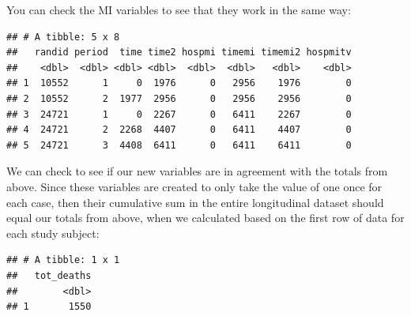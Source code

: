 \documentclass[
]{book}
\newenvironment{Shaded}{\begin{snugshade}}{\end{snugshade}}
\newcommand{\CommentTok}[1]{\textcolor[rgb]{0.56,0.35,0.01}{\textit{#1}}}
\newcommand{\DataTypeTok}[1]{\textcolor[rgb]{0.13,0.29,0.53}{#1}}
\newcommand{\DecValTok}[1]{\textcolor[rgb]{0.00,0.00,0.81}{#1}}
\newcommand{\KeywordTok}[1]{\textcolor[rgb]{0.13,0.29,0.53}{\textbf{#1}}}
\newcommand{\NormalTok}[1]{#1}
\newcommand{\OperatorTok}[1]{\textcolor[rgb]{0.81,0.36,0.00}{\textbf{#1}}}
\newcommand{\StringTok}[1]{\textcolor[rgb]{0.31,0.60,0.02}{#1}}
\begin{document}
You can check the MI variables to see that they work in the same way:

\begin{Shaded}
\end{Shaded}

\begin{verbatim}
## # A tibble: 5 x 8
##   randid period  time time2 hospmi timemi timemi2 hospmitv
##    <dbl>  <dbl> <dbl> <dbl>  <dbl>  <dbl>   <dbl>    <dbl>
## 1  10552      1     0  1976      0   2956    1976        0
## 2  10552      2  1977  2956      0   2956    2956        0
## 3  24721      1     0  2267      0   6411    2267        0
## 4  24721      2  2268  4407      0   6411    4407        0
## 5  24721      3  4408  6411      0   6411    6411        0
\end{verbatim}

We can check to see if our new variables are in agreement with the totals from above. Since these variables are created to only take the value of one once for each case, then their cumulative sum in the entire longitudinal dataset should equal our totals from above, when we calculated based on the first row of data for each study subject:

\begin{Shaded}
\end{Shaded}

\begin{verbatim}
## # A tibble: 1 x 1
##   tot_deaths
##        <dbl>
## 1       1550
\end{verbatim}

\begin{Shaded}
\end{Shaded}
\end{document}
